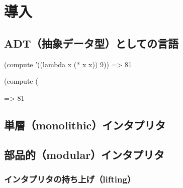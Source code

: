 \documentclass[11pt, oneside]{jsarticle}   	%
\begin{document}
\section{導入}
\subsection{ ADT（抽象データ型）としての言語}
(compute '((lambda x (* x x)) 9))
=> 81

(compute (%

=> 81













\subsection{単層（monolithic）インタプリタ}
\subsection{部品的（modular）インタプリタ}











\subsubsection{インタプリタの持ち上げ（lifting）}
\end{document}
